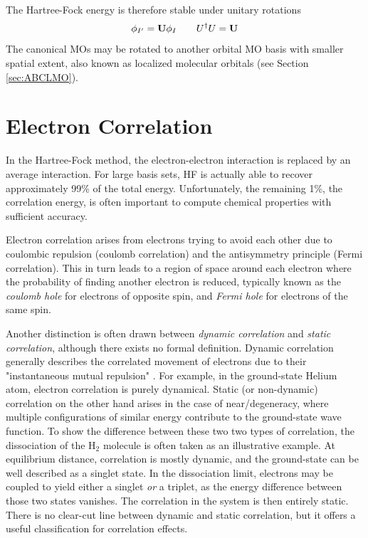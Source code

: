 The Hartree-Fock energy is therefore stable under unitary rotations
\begin{equation}
\phi_{I'} = \mathbf{U} \phi_I \qquad U^{\dagger} U = \mathbf{U}
\end{equation}
\noindent The canonical MOs may be rotated to another orbital MO basis with smaller spatial extent, also known as localized molecular orbitals (see Section \ref{sec:ABCLMO}).

\section{Electron Correlation \label{sec:CORRELATION}}

In the Hartree-Fock method, the electron-electron interaction is replaced by an average interaction. For large basis sets, HF is actually able to recover approximately 99\% of the total energy. Unfortunately, the remaining 1\%, the correlation energy, is often important to compute chemical properties with sufficient accuracy.

Electron correlation arises from electrons trying to avoid each other due to coulombic repulsion (coulomb correlation) and the antisymmetry principle (Fermi correlation). This in turn leads to a region of space around each electron where the probability of finding another electron is reduced, typically known as the \emph{coulomb hole} for electrons of opposite spin, and \emph{Fermi hole} for electrons of the same spin. 

Another distinction is often drawn between \emph{dynamic correlation} and \emph{static correlation}, although there exists no formal definition. Dynamic correlation generally describes the correlated movement of electrons due to their "instantaneous mutual repulsion" \cite{Jen2017}. For example, in the ground-state Helium atom, electron correlation is purely dynamical. Static (or non-dynamic) correlation on the other hand arises in the case of near\-/degeneracy, where multiple configurations of similar energy contribute to the ground-state wave function. To show the difference between these two two types of correlation, the dissociation of the H$_2$ molecule is often taken as an illustrative example. At equilibrium distance, correlation is mostly dynamic, and the ground-state can be well described as a singlet state. In the dissociation limit, electrons may be coupled to yield either a singlet \emph{or} a triplet, as the energy difference between those two states vanishes. The correlation in the system is then entirely static. There is no clear-cut line between dynamic and static correlation, but it offers a useful classification for correlation effects.

